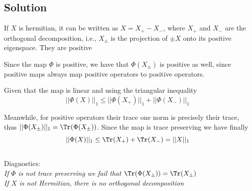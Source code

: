 \subsection*{Solution}

\begin{solution}[Part (a)]
If $X$ is hermitian, it can be written as $X= X_+ - X_-$, where $X_+$ and $X_-$ are the orthogonal decomposition, i.e., $X_{\pm}$ is the projection of $\pm X$ onto its positive eigenspace. They are positive  

Since the map $\Phi$ is positive, we have that $\Phi(X_{\pm})$ is positive as well, since positive maps always map positive operators to positive operators. 

Given that the map is linear and using the triangular inequality
$$||\Phi(X)||_1\leq ||\Phi(X_+)||_1 + ||\Phi(X_-)||_1$$

Meanwhile, for positive operators their trace one norm is precisely their trace, thus $||\Phi(X_{\pm})||_1 = \Tr(\Phi(X_{\pm}))$. Since the map is trace preserving we have finally $$||\Phi(X)||_1 \leq \Tr(X_+) + \Tr(X_-) = ||X||_1$$
\\
Diagnostics:\\
\emph{If $\Phi$ is not trace preserving we fail that $\Tr(\Phi(X_{\pm}))=\Tr(X_{\pm})$}\\
\emph{If $X$ is not Hermitian, there is no orthogonal decomposition} 
\end{solution}

